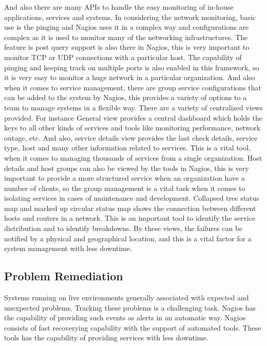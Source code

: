 \documentclass[9pt,twocolumn,twoside]{styles/osajnl}
\begin{document}
And also there are many APIs to handle the
easy monitoring of in-house applications, services and systems. In
considering the network monitoring, basic use is the pinging and
Nagios uses it in a complex way and configurations are complex as it
is used to monitor many of the networking infrastructures. The feature
is post query support is also there in Nagios, this is very important
to monitor TCP or UDP connections with a particular host. The
capability of pinging and keeping track on multiple ports is also
enabled in this framework, so it is very easy to monitor a huge
network in a particular organization. And also when it comes to
service management, there are group service configurations that can be
added to the system by Nagios, this provides a variety of options to a
team to manage systems in a flexible way. There are a variety of
centralized views provided. For instance General view provides a
central dashboard which holds the keys to all other kinds of services
and tools like monitoring performance, network outage, etc. And also,
service details view provides the last check details, service type,
host and many other information related to services. This is a vital
tool, when it comes to managing thousands of services from a single
organization. Host details and host groups can also be viewed by the
tools in Nagios, this is very important to provide a more structured
service when an organization have a number of clients, so the group
management is a vital task when it comes to isolating services in
cases of maintenance and development. Collapsed tree status map and
marked up circular status map shows the connection between different
hosts and routers in a network. This is an important tool to identify
the service distribution and to identify breakdowns. By these views,
the failures can be notified by a physical and geographical location,
and this is a vital factor for a system management with less downtime.

\subsection{Problem Remediation}

Systems running on live environments generally associated with
expected and unexpected problems. Tracking these problems is a
challenging task.  Nagios has the capability of providing such events
as alerts in an automatic way.  Nagios consists of fast recoverying
capability with the support of automated tools. These tools has the
capability of providing services with less downtime. 
\end{document}
